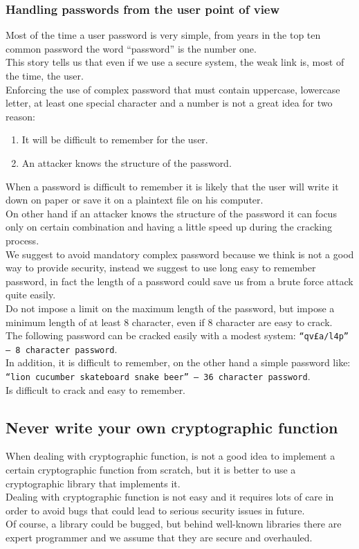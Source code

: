 \subsubsection{Handling passwords from the user point of view}
Most of the time a user password is very simple, from years in the top ten common password the word “password” is the number one.\\
This story tells us that even if we use a secure system, the weak link is, most of the time, the user.\\
Enforcing the use of complex password that must contain uppercase, lowercase letter, at least one special character and a number is not a great idea for two reason:
\begin{enumerate}
	\item It will be difficult to remember for the user.
	\item An attacker knows the structure of the password.
\end{enumerate}

When a password is difficult to remember it is likely that the user will write it down on paper or save it on a plaintext file on his computer.\\
On other hand if an attacker knows the structure of the password it can focus only on certain combination and having a little speed up during the cracking process.\\

We suggest to avoid mandatory complex password because we think is not a good way to provide security, instead we suggest to use long easy to remember password, in fact the length of a password could save us from a brute force attack quite easily.\\
Do not impose a limit on the maximum length of the password, but impose a minimum length of at least 8 character, even if 8 character are easy to crack.\\
The following password can be cracked easily with a modest system:
\texttt{“qv£a/l4p” – 8 character password}.\\
In addition, it is difficult to remember, on the other hand a simple password like:
\texttt{“lion cucumber skateboard snake beer” – 36 character password}.\\
Is difficult to crack and easy to remember.

\subsection{Never write your own cryptographic function}
When dealing with cryptographic function, is not a good idea to implement a certain cryptographic function from scratch, but it is better to use a cryptographic library that implements it.\\
Dealing with cryptographic function is not easy and it requires lots of care in order to avoid bugs that could lead to serious security issues in future.\\
Of course, a library could be bugged, but behind well-known libraries there are expert programmer and we assume that they are secure and overhauled.\\

